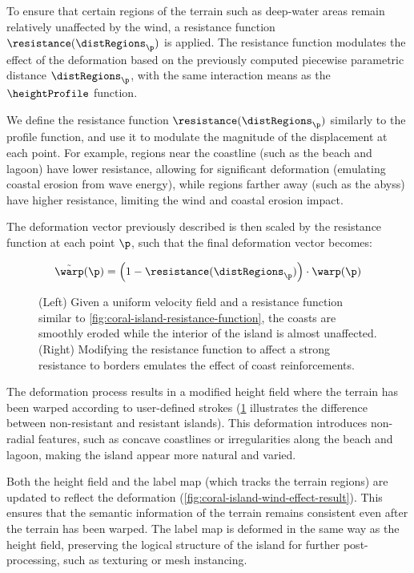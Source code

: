 To ensure that certain regions of the terrain such as deep-water areas remain relatively unaffected by the wind, a resistance function $\resistance(\distRegions_\p)$ is applied. The resistance function modulates the effect of the deformation based on the previously computed piecewise parametric distance $\distRegions_\p$, with the same interaction means as the $\heightProfile$ function.

We define the resistance function $\resistance(\distRegions_\p)$ similarly to the profile function, and use it to modulate the magnitude of the displacement at each point. For example, regions near the coastline (such as the beach and lagoon) have lower resistance, allowing for significant deformation (emulating coastal erosion from wave energy), while regions farther away (such as the abyss) have higher resistance, limiting the wind and coastal erosion impact.

The deformation vector previously described is then scaled by the resistance function at each point $\p$, such that the final deformation vector becomes:

\begin{align}
    \Tilde{\warp}(\p) = \left(1 - \resistance(\distRegions_\p) \right) \cdot \warp(\p)
\end{align}

\begin{figure}
    \caption{(Left) Given a uniform velocity field and a resistance function similar to \cref{fig:coral-island-resistance-function}, the coasts are smoothly eroded while the interior of the island is almost unaffected. (Right) Modifying the resistance function to affect a strong resistance to borders emulates the effect of coast reinforcements.}
    \label{fig:coral-island-strong-low-resistance}
\end{figure}

The deformation process results in a modified height field where the terrain has been warped according to user-defined strokes (\cref{fig:coral-island-strong-low-resistance} illustrates the difference between non-resistant and resistant islands). This deformation introduces non-radial features, such as concave coastlines or irregularities along the beach and lagoon, making the island appear more natural and varied.

Both the height field and the label map (which tracks the terrain regions) are updated to reflect the deformation (\cref{fig:coral-island-wind-effect-result}). This ensures that the semantic information of the terrain remains consistent even after the terrain has been warped. The label map is deformed in the same way as the height field, preserving the logical structure of the island for further post-processing, such as texturing or mesh instancing.

